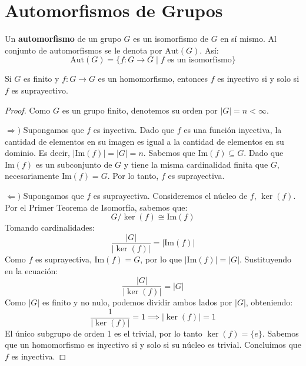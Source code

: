 \section{Automorfismos de Grupos}
\label{chap:automorfismos}

\begin{defi}
    Un \textbf{automorfismo} de un grupo $G$ es un isomorfismo de $G$ en sí mismo.
    Al conjunto de automorfismos se le denota por $\text{Aut}(G)$. Así:
    \begin{equation*}
        \text{Aut}(G) = \{ f: G \to G \mid f \text{ es un isomorfismo} \}
    \end{equation*}
\end{defi}

\begin{obs}
    Si $G$ es finito y $f: G \to G$ es un homomorfismo, entonces $f$ es inyectivo si y solo si $f$ es suprayectivo.
\end{obs}

\begin{proof}
    Como $G$ es un grupo finito, denotemos su orden por $|G| = n < \infty$.
    
    $\Rightarrow)$ Supongamos que $f$ es inyectiva.
    Dado que $f$ es una función inyectiva, la cantidad de elementos en su imagen es igual a la cantidad de elementos en su dominio.
    Es decir, $|\text{Im}(f)| = |G| = n$.
    Sabemos que $\text{Im}(f) \subseteq G$. Dado que $\text{Im}(f)$ es un subconjunto de $G$ y tiene la misma cardinalidad finita que $G$, necesariamente $\text{Im}(f) = G$.
    Por lo tanto, $f$ es suprayectiva.

    $\Leftarrow)$ Supongamos que $f$ es suprayectiva.
    Consideremos el núcleo de $f$, $\ker(f)$. Por el Primer Teorema de Isomorfía, sabemos que:
    \begin{equation*}
        G / \ker(f) \cong \text{Im}(f)
    \end{equation*}
    Tomando cardinalidades:
    \begin{equation*}
        \frac{|G|}{|\ker(f)|} = |\text{Im}(f)|
    \end{equation*}
    Como $f$ es suprayectiva, $\text{Im}(f) = G$, por lo que $|\text{Im}(f)| = |G|$. Sustituyendo en la ecuación:
    \begin{equation*}
        \frac{|G|}{|\ker(f)|} = |G|
    \end{equation*}
    Como $|G|$ es finito y no nulo, podemos dividir ambos lados por $|G|$, obteniendo:
    \begin{equation*}
        \frac{1}{|\ker(f)|} = 1 \implies |\ker(f)| = 1
    \end{equation*}
    El único subgrupo de orden 1 es el trivial, por lo tanto $\ker(f) = \{e\}$.
    Sabemos que un homomorfismo es inyectivo si y solo si su núcleo es trivial. Concluimos que $f$ es inyectiva.
\end{proof}

